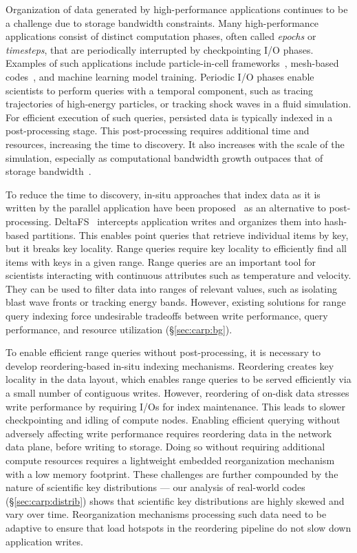 
Organization of data generated by high-performance applications continues to be a challenge due to
storage bandwidth constraints.
Many high-performance applications consist of distinct computation phases, often called
\emph{epochs} or \emph{timesteps}, that are periodically interrupted by checkpointing I/O phases.
Examples of such applications include particle-in-cell frameworks~\cite{Byna2012}, mesh-based
codes~\cite{Grete2023:Parthenon, Zhang2021:AMReX, Barke2024:Phoebus}, and machine learning model
training.
Periodic I/O phases enable scientists to perform queries with a temporal component, such as tracing
trajectories of high-energy particles, or tracking shock waves in a fluid simulation.
For efficient execution of such queries, persisted data is typically indexed in a post-processing
stage.
This post-processing requires additional time and resources, increasing the time to discovery.
It also increases with the scale of the simulation, especially as computational bandwidth growth
outpaces that of storage bandwidth~\cite{Bauer2016:SituMethodsInfrastructures}.

To reduce the time to discovery, in-situ approaches that index data as it is written by the
parallel application have been proposed~\cite{Child2012:InSitu} as an alternative to
post-processing.
DeltaFS~\cite{Zheng2018:DeltaFS} intercepts application writes and organizes them into hash-based
partitions.
This enables point queries that retrieve individual items by key, but it breaks key locality.
Range queries require key locality to efficiently find all items with keys in a given range.
Range queries are an important tool for scientists interacting with continuous attributes such as
temperature and velocity.
They can be used to filter data into ranges of relevant values, such as isolating blast wave fronts
or tracking energy bands.
However, existing solutions for range query indexing force undesirable tradeoffs between write
performance, query performance, and resource utilization (\S\ref{sec:carp:bg}).

To enable efficient range queries without post-processing, it is necessary to develop
reordering-based in-situ indexing mechanisms.
Reordering creates key locality in the data layout, which enables range queries to be served
efficiently via a small number of contiguous writes.
However, reordering of on-disk data stresses write performance by requiring I/Os for index
maintenance.
This leads to slower checkpointing and idling of compute nodes.
Enabling efficient querying without adversely affecting write performance requires reordering data
in the network data plane, before writing to storage.
Doing so without requiring additional compute resources requires a lightweight embedded
reorganization mechanism with a low memory footprint.
These challenges are further compounded by the nature of scientific key distributions --- our
analysis of real-world codes (\S\ref{sec:carp:distrib}) shows that scientific key distributions are
highly skewed and vary over time.
Reorganization mechanisms processing such data need to be adaptive to ensure that load hotspots in
the reordering pipeline do not slow down application writes.

